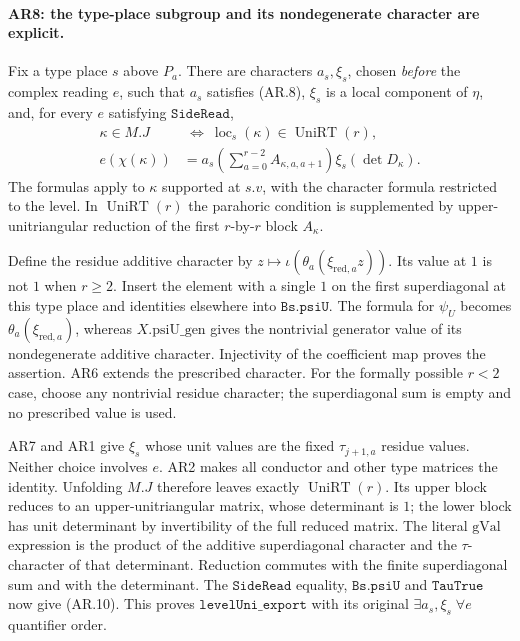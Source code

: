 \paragraph{AR8: the type-place subgroup and its nondegenerate character are explicit.}
Fix a type place $s$ above $P_a$. There are characters $a_s,\xi_s$,
chosen \emph{before} the complex reading $e$, such that $a_s$ satisfies
(AR.8), $\xi_s$ is a local component of $\eta$, and, for every
$e$ satisfying $\texttt{SideRead}$,
\[
 \begin{split}
  \kappa\in M.J&\ \Longleftrightarrow\
       \operatorname{loc}_s(\kappa)\in\operatorname{UniRT}(r),\\
  e(\chi(\kappa))&=
       a_s\!\left(\sum_{a=0}^{r-2} A_{\kappa,a,a+1}\right)
       \xi_s(\det D_\kappa).
 \end{split}                                                   \tag{AR.10}
\]
The formulas apply to $\kappa$ supported at $s.v$, with the character
formula restricted to the level. In $\operatorname{UniRT}(r)$ the
parahoric condition is supplemented by upper-unitriangular reduction
of the first $r$-by-$r$ block $A_\kappa$.

Define the residue additive character by
$z\mapsto\iota(\theta_a(\xi_{\mathrm{red},a}z))$.
Its value at $1$ is not $1$ when $r\ge2$. Insert the element with a
single $1$ on the first superdiagonal at this type place and identities
elsewhere into $\texttt{Bs.psiU}$. The formula for $\psi_U$ becomes
$\theta_a(\xi_{\mathrm{red},a})$, whereas
$X.\mathrm{psiU\_gen}$ gives the nontrivial generator value of its
nondegenerate additive character. Injectivity of the coefficient map
proves the assertion. AR6 extends the prescribed character.
For the formally possible $r<2$ case, choose any nontrivial residue
character; the superdiagonal sum is empty and no prescribed value
is used.

AR7 and AR1 give $\xi_s$ whose unit values are the fixed
$\tau_{j+1,a}$ residue values. Neither choice involves $e$.
AR2 makes all conductor and other type matrices the identity.
Unfolding $M.J$ therefore leaves exactly $\operatorname{UniRT}(r)$.
Its upper block reduces to an upper-unitriangular matrix, whose
determinant is $1$; the lower block has unit determinant by invertibility
of the full reduced matrix. The literal $\mathrm{gVal}$ expression
is the product of the additive superdiagonal character and the
$\tau$-character of that determinant. Reduction commutes with the
finite superdiagonal sum and with the determinant. The
$\texttt{SideRead}$ equality, $\texttt{Bs.psiU}$ and
$\texttt{TauTrue}$ now give (AR.10). This proves
$\texttt{levelUni\_export}$ with its original $\exists a_s,\xi_s\;\forall e$
quantifier order.

